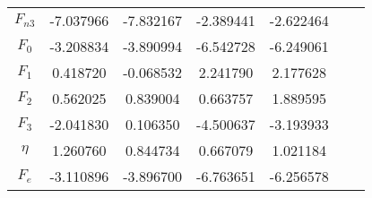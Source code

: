 \documentclass[prb,preprint]{revtex4-2}
\begin{document}
\begin{table}
{\begin{tabular}{ccccccc}
$F_{n3}$     & -7.037966   & -7.832167   & -2.389441   & -2.622464   &            &              \\
$F_{0}$      & -3.208834   & -3.890994   & -6.542728   & -6.249061   &            &              \\
$F_{1}$      & 0.418720    & -0.068532   & 2.241790    & 2.177628    &            &              \\
$F_{2}$      & 0.562025    & 0.839004    & 0.663757    & 1.889595    &            &              \\
$F_{3}$      & -2.041830   & 0.106350    & -4.500637   & -3.193933   &            &              \\
$\eta$       & 1.260760    & 0.844734    & 0.667079    & 1.021184    &            &              \\
$F_{e}$      & -3.110896   & -3.896700   & -6.763651   & -6.256578   &            &              \\
\bottomrule
\end{tabular}
}
\label{tab:binary_MoNi_eam}
\end{table}

% 
%
\begin{table}
\caption{
Model parameters of the $\mu(r)$ and $\omega(r)$ functions of the binary Mo-Ni 
ML-ADP.
}
\label{tab:binary_MoNi_adp}
\end{table}
\end{document}
